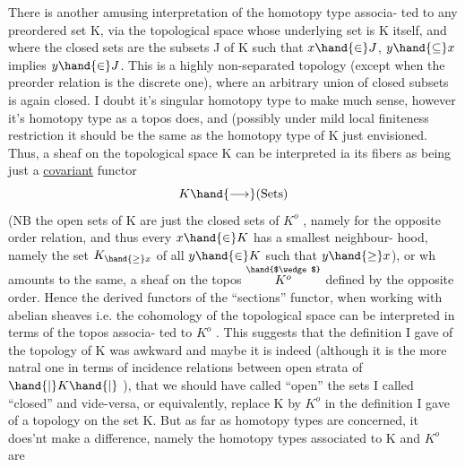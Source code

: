 
There is another amusing interpretation of the homotopy type associa-%
ted to any preordered set K,  via the topological space whose underlying
\margin{$\times$} set is K itself,  and where the closed sets are the subsets J of K
such that  $x \hand{\in} J$,  $y \hand{\subseteq} x$ implies $y \hand{\in} J$.  This is a highly non-separated
topology (except when the preorder relation is the discrete one),  where
an arbitrary union of closed subsets is again closed.  I doubt it's
singular homotopy type to make much sense,  however it's  homotopy type
as a topos does,  and (possibly under mild loc\unsure{\hand{-}}al finiteness restriction\hand{)}
it should be the same as the homotopy type of K just envisioned.  Thus,
a sheaf on the topological space K   can be interpreted 
ia its fibers as being just a \uline{covariant} functor
\[ K \hand{\longrightarrow} (\text{Sets}) \]
(NB  the open sets of K are just the closed sets of $K^{o}$ , namely for the
opposite order relation,  and thus every $x \hand{\in} K$ has a smallest neighbour-%
hood,  namely the set  $K_{\hand{\geq} x}$  of all $y \hand{\in} K$ such that $y \hand{\geq} x$),  or wh
amounts to the same,  a sheaf on the topos  $\overset{\hand{$\wedge$}}{K^{o}}$  defined by the opposite
order.  Hence the derived functors of the ``sections'' functor,  when
working with abelian sheaves  i.e.  the cohomology of the
topological space can be interpreted in terms of the topos associa-%
ted to $K^{o}$ .  This suggests that the definition I gave of the topology
of K was awkward and maybe it is indeed (although it is the more natral
one in terms of incidence relations between open strata of $\hand{|}K\hand{|}$ ), that
we should have called ``open'' the sets I called ``closed'' and vide-versa,
or equivalently,  replace K by $K^{o}$ in the definition I gave of a topology
on the set K.  But as far as homotopy types are concerned, it does'nt
make a difference,  namely the homotopy types associated to K and $K^{o}$ are
